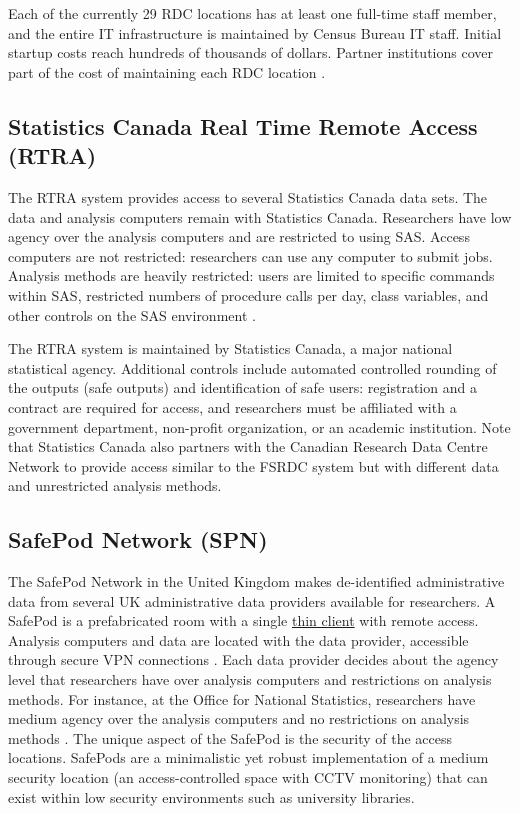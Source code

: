 Each of the currently 29 RDC locations has at least one full-time staff member, and the entire IT infrastructure is maintained by Census Bureau IT staff. Initial startup costs reach hundreds of thousands of dollars. Partner institutions cover part of the cost of maintaining each RDC location \citep{unitedstatescensusbureau}.

\hypertarget{statistics-canada-real-time-remote-access-rtra}{%
\subsection{Statistics Canada Real Time Remote Access (RTRA)}\label{statistics-canada-real-time-remote-access-rtra}}

The RTRA system provides access to several Statistics Canada data sets. The data and analysis computers remain with Statistics Canada. Researchers have low agency over the analysis computers and are restricted to using SAS. Access computers are not restricted: researchers can use any computer to submit jobs. Analysis methods are heavily restricted: users are limited to specific commands within SAS, restricted numbers of procedure calls per day, class variables, and other controls on the SAS environment \citep{statisticscanada2018a}.

The RTRA system is maintained by Statistics Canada, a major national statistical agency. Additional controls include automated controlled rounding of the outputs (safe outputs) and identification of safe users: registration and a contract are required for access, and researchers must be affiliated with a government department, non-profit organization, or an academic institution. Note that Statistics Canada also partners with the Canadian Research Data Centre Network to provide access similar to the FSRDC system but with different data and unrestricted analysis methods.

\hypertarget{safepod-network-spn}{%
\subsection{SafePod Network (SPN)}\label{safepod-network-spn}}

The SafePod Network in the United Kingdom makes de-identified administrative data from several UK administrative data providers available for researchers. A SafePod is a prefabricated room with a single \protect\hyperlink{thin-clients}{thin client} with remote access. Analysis computers and data are located with the data provider, accessible through secure VPN connections \citep{universityofbristol}. Each data provider decides about the agency level that researchers have over analysis computers and restrictions on analysis methods. For instance, at the Office for National Statistics, researchers have medium agency over the analysis computers and no restrictions on analysis methods \citep{officefornationalstatistics2020}. The unique aspect of the SafePod is the security of the access locations. SafePods are a minimalistic yet robust implementation of a medium security location (an access-controlled space with CCTV monitoring) that can exist within low security environments such as university libraries.

